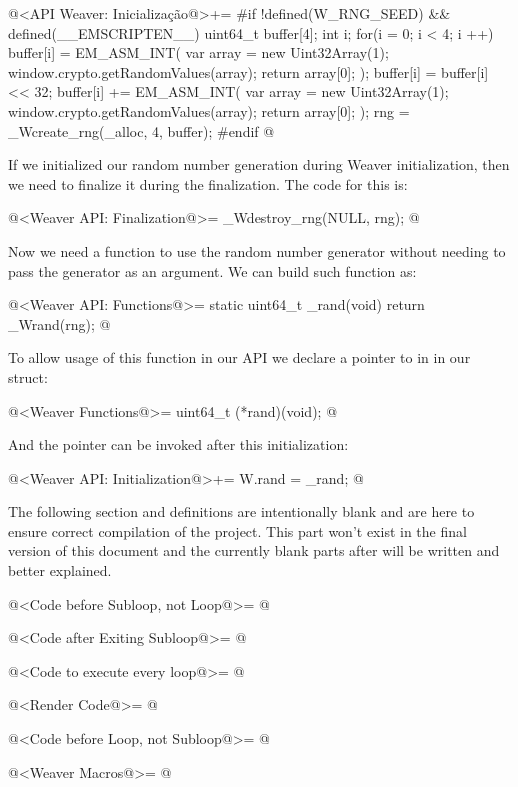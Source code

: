 \iniciocodigo
@<API Weaver: Inicialização@>+=
#if !defined(W_RNG_SEED) && defined(__EMSCRIPTEN__)
{
  uint64_t buffer[4];
  int i;
  for(i = 0; i < 4; i ++){
    buffer[i] = EM_ASM_INT({
      var array = new Uint32Array(1);
      window.crypto.getRandomValues(array);
      return array[0];
    });
    buffer[i] = buffer[i] << 32;
    buffer[i] += EM_ASM_INT({
      var array = new Uint32Array(1);
      window.crypto.getRandomValues(array);
      return array[0];
    });
  }
  rng = _Wcreate_rng(_alloc, 4, buffer);
}
#endif
@
\fimcodigo

If we initialized our random number generation during Weaver
initialization, then we need to finalize it during the
finalization. The code for this is:

\iniciocodigo
@<Weaver API: Finalization@>=
_Wdestroy_rng(NULL, rng);
@
\fimcodigo

Now we need a function to use the random number generator without
needing to pass the generator as an argument. We can build such
function as:

\iniciocodigo
@<Weaver API: Functions@>=
static uint64_t _rand(void){
  return _Wrand(rng);
}
@
\fimcodigo

To allow usage of this function in our API we declare a pointer to in
in our  struct:

\iniciocodigo
@<Weaver Functions@>=
uint64_t (*rand)(void);
@
\fimcodigo

And the pointer can be invoked after this initialization:

\iniciocodigo
@<Weaver API: Initialization@>+=
W.rand = _rand;
@
\fimcodigo



The following section and definitions are intentionally blank and are
here to ensure correct compilation of the project. This part won't
exist in the final version of this document and the currently blank
parts after will be written and better explained.

\iniciocodigo
@<Code before Subloop, not Loop@>= @
\fimcodigo

\iniciocodigo
@<Code after Exiting Subloop@>= @
\fimcodigo

\iniciocodigo
@<Code to execute every loop@>= @
\fimcodigo

\iniciocodigo
@<Render Code@>= @
\fimcodigo

\iniciocodigo
@<Code before Loop, not Subloop@>= @
\fimcodigo

\iniciocodigo
@<Weaver Macros@>= @
\fimcodigo





\fim

